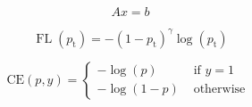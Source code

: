 
\begin{equation}\label{eq_1}
\boxed{Ax=b}
\end{equation}

\begin{equation}
\operatorname{FL}\left(p_{\mathrm{t}}\right)=-\left(1-p_{\mathrm{t}}\right)^\gamma \log \left(p_{\mathrm{t}}\right)
\end{equation}

\begin{equation}\label{eq:CE}
\mathrm{CE}(p, y)= \begin{cases}-\log (p) & \text { if } y=1 \\ -\log (1-p) & \text { otherwise }\end{cases}
\end{equation}
